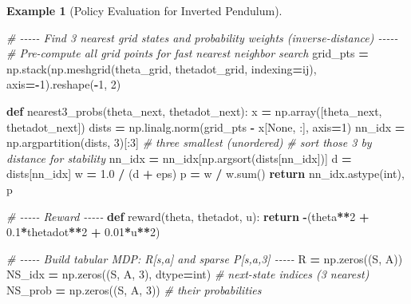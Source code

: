 \documentclass[
]{book}
\newenvironment{Shaded}{\begin{snugshade}}{\end{snugshade}}
\newcommand{\BuiltInTok}[1]{#1}
\newcommand{\CommentTok}[1]{\textcolor[rgb]{0.56,0.35,0.01}{\textit{#1}}}
\newcommand{\ControlFlowTok}[1]{\textcolor[rgb]{0.13,0.29,0.53}{\textbf{#1}}}
\newcommand{\DecValTok}[1]{\textcolor[rgb]{0.00,0.00,0.81}{#1}}
\newcommand{\FloatTok}[1]{\textcolor[rgb]{0.00,0.00,0.81}{#1}}
\newcommand{\KeywordTok}[1]{\textcolor[rgb]{0.13,0.29,0.53}{\textbf{#1}}}
\newcommand{\NormalTok}[1]{#1}
\newcommand{\OperatorTok}[1]{\textcolor[rgb]{0.81,0.36,0.00}{\textbf{#1}}}
\newcommand{\StringTok}[1]{\textcolor[rgb]{0.31,0.60,0.02}{#1}}
\newcommand{\VariableTok}[1]{\textcolor[rgb]{0.00,0.00,0.00}{#1}}
\theoremstyle{definition}
\theoremstyle{definition}
\newtheorem{example}{Example}[chapter]
\theoremstyle{definition}
\theoremstyle{definition}
\theoremstyle{remark}
\begin{document}
\begin{example}[Policy Evaluation for Inverted Pendulum]
\begin{Shaded}
\begin{Highlighting}[]
\CommentTok{\# {-}{-}{-}{-}{-} Find 3 nearest grid states and probability weights (inverse{-}distance) {-}{-}{-}{-}{-}}
\CommentTok{\# Pre{-}compute all grid points for fast nearest neighbor search}
\NormalTok{grid\_pts }\OperatorTok{=}\NormalTok{ np.stack(np.meshgrid(theta\_grid, thetadot\_grid, indexing}\OperatorTok{=}\StringTok{\textquotesingle{}ij\textquotesingle{}}\NormalTok{), axis}\OperatorTok{={-}}\DecValTok{1}\NormalTok{).reshape(}\OperatorTok{{-}}\DecValTok{1}\NormalTok{, }\DecValTok{2}\NormalTok{)}

\KeywordTok{def}\NormalTok{ nearest3\_probs(theta\_next, thetadot\_next):}
\NormalTok{    x }\OperatorTok{=}\NormalTok{ np.array([theta\_next, thetadot\_next])}
\NormalTok{    dists }\OperatorTok{=}\NormalTok{ np.linalg.norm(grid\_pts }\OperatorTok{{-}}\NormalTok{ x[}\VariableTok{None}\NormalTok{, :], axis}\OperatorTok{=}\DecValTok{1}\NormalTok{)}
\NormalTok{    nn\_idx }\OperatorTok{=}\NormalTok{ np.argpartition(dists, }\DecValTok{3}\NormalTok{)[:}\DecValTok{3}\NormalTok{]  }\CommentTok{\# three smallest (unordered)}
    \CommentTok{\# sort those 3 by distance for stability}
\NormalTok{    nn\_idx }\OperatorTok{=}\NormalTok{ nn\_idx[np.argsort(dists[nn\_idx])]}
\NormalTok{    d }\OperatorTok{=}\NormalTok{ dists[nn\_idx]}
\NormalTok{    w }\OperatorTok{=} \FloatTok{1.0} \OperatorTok{/}\NormalTok{ (d }\OperatorTok{+}\NormalTok{ eps)}
\NormalTok{    p }\OperatorTok{=}\NormalTok{ w }\OperatorTok{/}\NormalTok{ w.}\BuiltInTok{sum}\NormalTok{()}
    \ControlFlowTok{return}\NormalTok{ nn\_idx.astype(}\BuiltInTok{int}\NormalTok{), p}

\CommentTok{\# {-}{-}{-}{-}{-} Reward {-}{-}{-}{-}{-}}
\KeywordTok{def}\NormalTok{ reward(theta, thetadot, u):}
    \ControlFlowTok{return} \OperatorTok{{-}}\NormalTok{(theta}\OperatorTok{**}\DecValTok{2} \OperatorTok{+} \FloatTok{0.1}\OperatorTok{*}\NormalTok{thetadot}\OperatorTok{**}\DecValTok{2} \OperatorTok{+} \FloatTok{0.01}\OperatorTok{*}\NormalTok{u}\OperatorTok{**}\DecValTok{2}\NormalTok{)}

\CommentTok{\# {-}{-}{-}{-}{-} Build tabular MDP: R[s,a] and sparse P[s,a,3] {-}{-}{-}{-}{-}}
\NormalTok{R }\OperatorTok{=}\NormalTok{ np.zeros((S, A))}
\NormalTok{NS\_idx }\OperatorTok{=}\NormalTok{ np.zeros((S, A, }\DecValTok{3}\NormalTok{), dtype}\OperatorTok{=}\BuiltInTok{int}\NormalTok{)   }\CommentTok{\# next{-}state indices (3 nearest)}
\NormalTok{NS\_prob }\OperatorTok{=}\NormalTok{ np.zeros((S, A, }\DecValTok{3}\NormalTok{))            }\CommentTok{\# their probabilities}


\end{Highlighting}
\end{Shaded}
\end{example}
\end{document}
